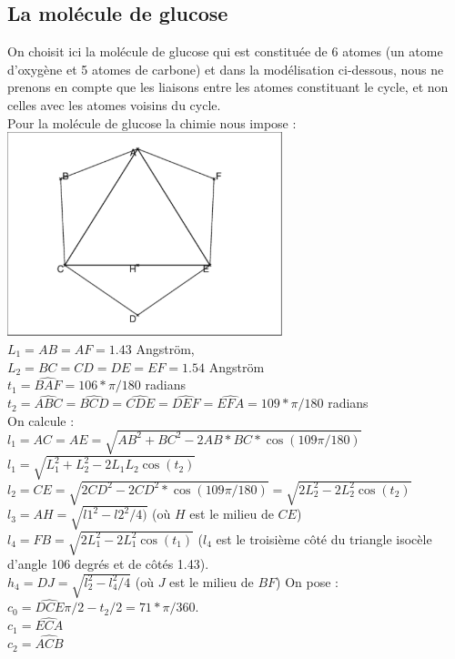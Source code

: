 \documentclass[a4paper,11pt]{book}
\begin{document}
\subsection{La mol\'ecule de glucose}
On choisit ici la mol\'ecule de glucose qui est constitu\'ee de 6 atomes (un 
atome d'oxyg\`ene et 5 atomes de carbone) et dans la mod\'elisation ci-dessous, 
nous ne prenons en compte que les liaisons entre les atomes constituant le 
cycle, et non celles avec les atomes voisins du cycle.\\
Pour la mol\'ecule de glucose la chimie nous impose :\\
\includegraphics[width=8cm]{glucose}\\
$L_1=AB=AF=1.43$ Angström,\\ 
$L_2=BC=CD=DE=EF=1.54$ Angström\\
$t_1=\widehat{BAF}=106*\pi/180$ radians\\
$t_2=\widehat{ABC}=\widehat{BCD}=\widehat{CDE}=\widehat{DEF}=\widehat{EFA}=109*\pi/180$ radians\\
On calcule :\\
$l_1=AC=AE=\sqrt{AB^2+BC^2-2AB*BC*\cos(109\pi/180)}$\\
$l_1=\sqrt{L_1^2+L_2^2-2L_1L_2\cos(t_2)}$\\
$l_2=CE=\sqrt{2CD^2-2CD^2*\cos(109\pi/180)}=\sqrt{2L_2^2-2L_2^2\cos(t_2)}$\\
$l_3=AH=\sqrt{l1^2-l2^2/4)}$ (o\`u $H$ est le milieu de $CE$)\\
$l_4=FB=\sqrt{2L_1^2-2L_1^2\cos(t_1)}$ ($l_4$ est le troisi\`eme c\^ot\'e
du triangle isoc\`ele d'angle 106 degr\'es et de c\^ot\'es 1.43).\\
$h_4=DJ=\sqrt{l_2^2-l_4^2/4}$ (o\`u $J$ est le milieu de $BF$)
On pose  :\\
$c_0=\widehat{DCE}\pi/2-t_2/2=71*\pi/360$.\\
$c_1=\widehat{ECA}$ \\
$c_2=\widehat{ACB}$ \\
\end{document}

